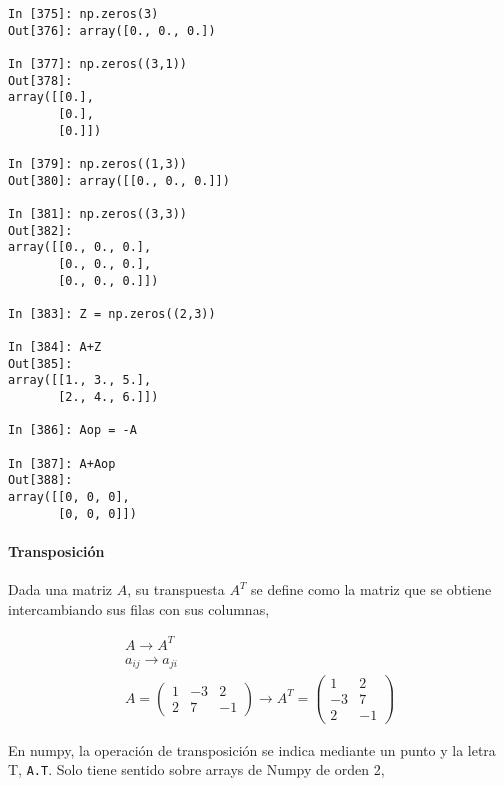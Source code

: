 \begin{center}
    \begin{minipage}{.5\textwidth}
        \begin{verbatim}
In [375]: np.zeros(3)
Out[376]: array([0., 0., 0.])

In [377]: np.zeros((3,1))
Out[378]: 
array([[0.],
       [0.],
       [0.]])

In [379]: np.zeros((1,3))
Out[380]: array([[0., 0., 0.]])

In [381]: np.zeros((3,3))
Out[382]: 
array([[0., 0., 0.],
       [0., 0., 0.],
       [0., 0., 0.]])
       
In [383]: Z = np.zeros((2,3))

In [384]: A+Z
Out[385]: 
array([[1., 3., 5.],
       [2., 4., 6.]])

In [386]: Aop = -A

In [387]: A+Aop
Out[388]: 
array([[0, 0, 0],
       [0, 0, 0]])
        \end{verbatim}
    \end{minipage}
\end{center}

\begin{paracol}{2}
\paragraph{Transposición}
Dada una matriz $A$, su transpuesta $A^T$ se define como la matriz que se obtiene intercambiando sus filas con sus columnas,    
\end{paracol}

\begin{gather*}
A \rightarrow  A^T\\
a_{ij} \rightarrow  a_{ji}\\
A=
\begin{pmatrix}
1& -3& 2 \\
2& 7& -1
\end{pmatrix}  \rightarrow 
A^T=
\begin{pmatrix}
1& 2 \\
-3& 7\\
2 & -1
\end{pmatrix}
\end{gather*}

\begin{paracol}{2}
En numpy, la operación de transposición se indica mediante un punto y la letra T, \texttt{A.T}. Solo tiene sentido sobre arrays de Numpy de orden 2,  
\end{paracol}

